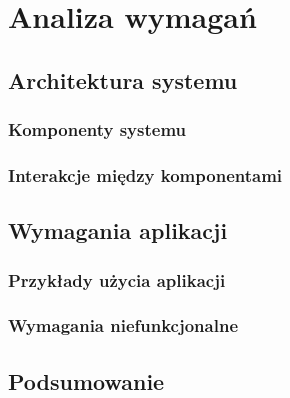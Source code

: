 \chapter{Analiza wymagań}

\section{Architektura systemu} 




\subsection{Komponenty systemu}

\subsection{Interakcje między komponentami}





\section{Wymagania aplikacji} %



\subsection{Przykłady użycia aplikacji}


\subsection{Wymagania niefunkcjonalne}


\section{Podsumowanie}

